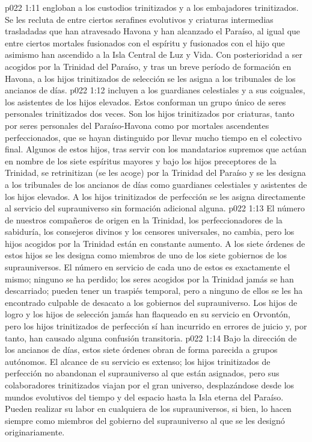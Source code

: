 \vs p022 1:11 \pc {} engloban a los custodios trinitizados y a los embajadores trinitizados. Se les recluta de entre ciertos serafines evolutivos y criaturas intermedias trasladadas que han atravesado Havona y han alcanzado el Paraíso, al igual que entre ciertos mortales fusionados con el espíritu y fusionados con el hijo que asimismo han ascendido a la Isla Central de Luz y Vida. Con posterioridad a ser acogidos por la Trinidad del Paraíso, y tras un breve período de formación en Havona, a los hijos trinitizados de selección se les asigna a los tribunales de los ancianos de días.
\vs p022 1:12 \pc {} incluyen a los guardianes celestiales y a sus coiguales, los asistentes de los hijos elevados. Estos conforman un grupo único de seres personales trinitizados dos veces. Son los hijos trinitizados por criaturas, tanto por seres personales del Paraíso\hyp{}Havona como por mortales ascendentes perfeccionados, que se hayan distinguido por llevar mucho tiempo en el colectivo final. Algunos de estos hijos, tras servir con los mandatarios supremos que actúan en nombre de los siete espíritus mayores y bajo los hijos preceptores de la Trinidad, se retrinitizan (se les acoge) por la Trinidad del Paraíso y se les designa a los tribunales de los ancianos de días como guardianes celestiales y asistentes de los hijos elevados. A los hijos trinitizados de perfección se les asigna directamente al servicio del suprauniverso sin formación adicional alguna.
\vs p022 1:13 \pc El número de nuestros compañeros de origen en la Trinidad, los perfeccionadores de la sabiduría, los consejeros divinos y los censores universales, no cambia, pero los hijos acogidos por la Trinidad están en constante aumento. A los siete órdenes de estos hijos se les designa como miembros de uno de los siete gobiernos de los suprauniversos. El número en servicio de cada uno de estos es exactamente el mismo; ninguno se ha perdido; los seres acogidos por la Trinidad jamás se han descarriado; pueden tener un traspiés temporal, pero a ninguno de ellos se les ha encontrado culpable de desacato a los gobiernos del suprauniverso. Los hijos de logro y los hijos de selección jamás han flaqueado en su servicio en Orvontón, pero los hijos trinitizados de perfección sí han incurrido en errores de juicio y, por tanto, han causado alguna confusión transitoria.
\vs p022 1:14 Bajo la dirección de los ancianos de días, estos siete órdenes obran de forma parecida a grupos autónomos. El alcance de su servicio es extenso; los hijos trinitizados de perfección no abandonan el suprauniverso al que están asignados, pero sus colaboradores trinitizados viajan por el gran universo, desplazándose desde los mundos evolutivos del tiempo y del espacio hasta la Isla eterna del Paraíso. Pueden realizar su labor en cualquiera de los suprauniversos, si bien, lo hacen siempre como miembros del gobierno del suprauniverso al que se les designó originariamente.

